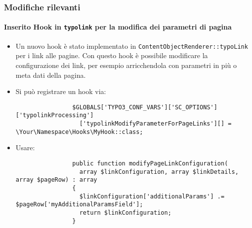 \begin{frame}[fragile]
	\frametitle{Modifiche rilevanti}
	\framesubtitle{Inserito Hook in \texttt{typolink} per la modifica dei parametri di pagina}

	\lstset{basicstyle=\tiny\ttfamily}

	\begin{itemize}
		\item Un nuovo hook è stato implementato in \texttt{ContentObjectRenderer::typoLink} per i link alle pagine.
			Con questo hook è possibile modificare la configurazione dei link, per esempio arricchendola con parametri
			in più o meta dati della pagina.

		\item Si può registrare un hook via:

			\begin{lstlisting}
				$GLOBALS['TYPO3_CONF_VARS']['SC_OPTIONS']['typolinkProcessing']
				  ['typolinkModifyParameterForPageLinks'][] = \Your\Namespace\Hooks\MyHook::class;
			\end{lstlisting}

		\item Usare:

			\begin{lstlisting}
				public function modifyPageLinkConfiguration(
				  array $linkConfiguration, array $linkDetails, array $pageRow) : array
				{
				  $linkConfiguration['additionalParams'] .= $pageRow['myAdditionalParamsField'];
				  return $linkConfiguration;
				}
			\end{lstlisting}

	\end{itemize}

\end{frame}


